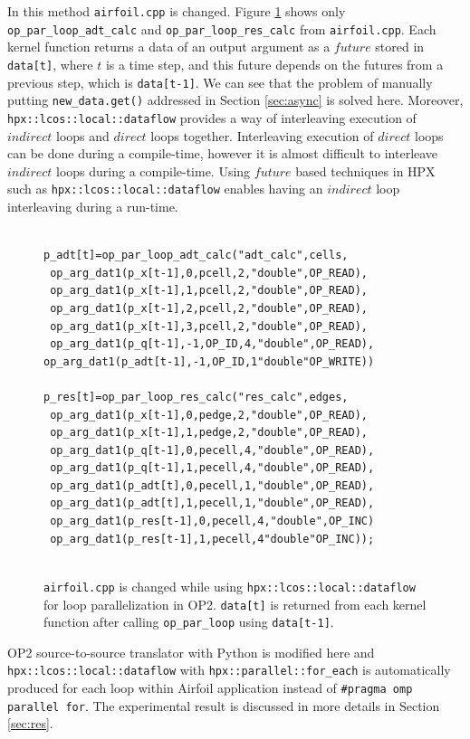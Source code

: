 \documentclass[conference]{IEEEtran}
\begin{document}
In this method \texttt{airfoil.cpp} is changed. Figure \ref{l3c} shows only \texttt{op\_par\_loop\_adt\_calc} and \texttt{op\_par\_loop\_res\_calc} from \texttt{airfoil.cpp}. Each kernel function returns a data of an output argument as a $future$ stored in \texttt{data[t]}, where $t$ is a time step, and this future depends on the futures from a previous step, which is \texttt{data[t-1]}. We can see that the problem of manually putting \texttt{new\_data.get()} addressed in Section \ref{sec:async} is solved here.  Moreover, \texttt{hpx::lcos::local::dataflow} provides a way of interleaving execution of $indirect$ loops and $direct$ loops together. Interleaving execution of $direct$ loops can be done during a compile-time, however it is almost difficult to interleave $indirect$ loops during a compile-time. Using $future$ based techniques in HPX such as \texttt{hpx::lcos::local::dataflow} enables having an $indirect$ loop interleaving during a run-time.  


\begin{figure} 
    \begin{lstlisting}
    
p_adt[t]=op_par_loop_adt_calc("adt_calc",cells, 
 op_arg_dat1(p_x[t-1],0,pcell,2,"double",OP_READ),
 op_arg_dat1(p_x[t-1],1,pcell,2,"double",OP_READ),
 op_arg_dat1(p_x[t-1],2,pcell,2,"double",OP_READ),
 op_arg_dat1(p_x[t-1],3,pcell,2,"double",OP_READ),
 op_arg_dat1(p_q[t-1],-1,OP_ID,4,"double",OP_READ),
op_arg_dat1(p_adt[t-1],-1,OP_ID,1"double"OP_WRITE))

p_res[t]=op_par_loop_res_calc("res_calc",edges, 
 op_arg_dat1(p_x[t-1],0,pedge,2,"double",OP_READ),
 op_arg_dat1(p_x[t-1],1,pedge,2,"double",OP_READ),
 op_arg_dat1(p_q[t-1],0,pecell,4,"double",OP_READ),
 op_arg_dat1(p_q[t-1],1,pecell,4,"double",OP_READ),
 op_arg_dat1(p_adt[t],0,pecell,1,"double",OP_READ),
 op_arg_dat1(p_adt[t],1,pecell,1,"double",OP_READ),
 op_arg_dat1(p_res[t-1],0,pecell,4,"double",OP_INC)
 op_arg_dat1(p_res[t-1],1,pecell,4"double"OP_INC));
  
    \end{lstlisting}
    \caption{\small{\texttt{airfoil.cpp} is changed while using \texttt{hpx::lcos::local::dataflow} for loop parallelization in OP2. \texttt{data[t]} is returned from each kernel function after calling \texttt{op\_par\_loop} using \texttt{data[t-1]}.}}
    \label{l3c}
\end{figure}



OP2 source-to-source translator with Python is modified here and \texttt{hpx::lcos::local::dataflow} with  \texttt{hpx::parallel::for\_each} is automatically produced for each loop within Airfoil application instead of \texttt{\#pragma omp parallel for}. The experimental result is discussed in more details in Section \ref{sec:res}.
\end{document}
